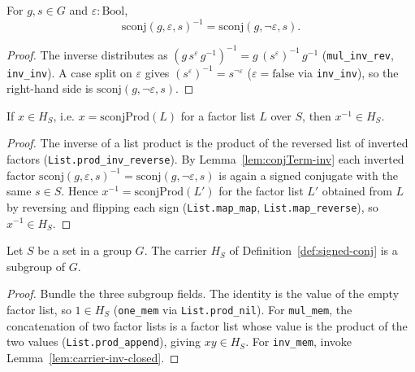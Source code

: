 \begin{lemma}
    \label{lem:conjTerm-inv}
    For $g, s \in G$ and $\varepsilon : \mathrm{Bool}$,
    \[
        \mathrm{sconj}(g, \varepsilon, s)^{-1} =
        \mathrm{sconj}(g, \lnot\varepsilon, s).
    \]
\end{lemma}
\begin{proof}
    The inverse distributes as $(g\,s^{\varepsilon}\,g^{-1})^{-1} =
    g\,(s^{\varepsilon})^{-1}\,g^{-1}$ (\texttt{mul\_inv\_rev}, \texttt{inv\_inv}).
    A case split on $\varepsilon$ gives $(s^{\varepsilon})^{-1} = s^{\lnot\varepsilon}$
    ($\varepsilon = \mathrm{false}$ via \texttt{inv\_inv}), so the right-hand side is
    $\mathrm{sconj}(g, \lnot\varepsilon, s)$.
\end{proof}

\begin{lemma}
    \label{lem:carrier-inv-closed}
    If $x \in H_S$, i.e. $x = \mathrm{sconjProd}(L)$ for a factor list $L$ over $S$,
    then $x^{-1} \in H_S$.
\end{lemma}
\begin{proof}
    The inverse of a list product is the product of the reversed list of inverted
    factors (\texttt{List.prod\_inv\_reverse}). By Lemma~\ref{lem:conjTerm-inv}
    each inverted factor $\mathrm{sconj}(g,\varepsilon,s)^{-1} =
    \mathrm{sconj}(g,\lnot\varepsilon,s)$ is again a signed conjugate with the same
    $s \in S$. Hence $x^{-1} = \mathrm{sconjProd}(L')$ for the factor list $L'$
    obtained from $L$ by reversing and flipping each sign
    (\texttt{List.map\_map}, \texttt{List.map\_reverse}), so $x^{-1} \in H_S$.
\end{proof}

\begin{lemma}
    \label{lem:prod-conjugates-subgroup}
    \leanok
    Let $S$ be a set in a group $G$. The carrier $H_S$ of
    Definition~\ref{def:signed-conj} is a subgroup of $G$.
\end{lemma}
\begin{proof}
    Bundle the three subgroup fields. The identity is the value of the empty
    factor list, so $1 \in H_S$ (\texttt{one\_mem} via \texttt{List.prod\_nil}).
    For \texttt{mul\_mem}, the concatenation of two factor lists is a factor list
    whose value is the product of the two values (\texttt{List.prod\_append}),
    giving $xy \in H_S$. For \texttt{inv\_mem}, invoke
    Lemma~\ref{lem:carrier-inv-closed}.
\end{proof}

